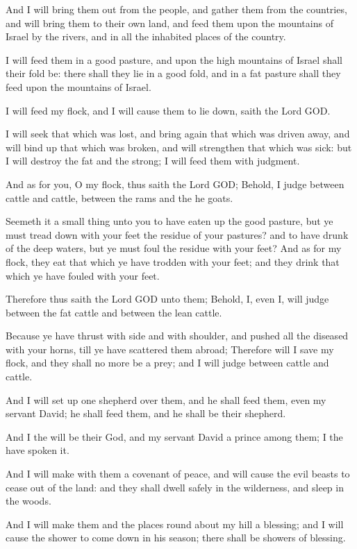 \Verse And I will bring them out from the people, and gather them from the countries, and will bring them to their own land, and feed them upon the mountains of Israel by the rivers, and in all the inhabited places of the country.

\Verse I will feed them in a good pasture, and upon the high mountains of Israel shall their fold be: there shall they lie in a good fold, and in a fat pasture shall they feed upon the mountains of Israel.

\Verse I will feed my flock, and I will cause them to lie down, saith the Lord GOD.

\Verse I will seek that which was lost, and bring again that which was driven away, and will bind up that which was broken, and will strengthen that which was sick: but I will destroy the fat and the strong; I will feed them with judgment.

\Verse And as for you, O my flock, thus saith the Lord GOD; Behold, I judge between cattle and cattle, between the rams and the he goats.

\Verse Seemeth it a small thing unto you to have eaten up the good pasture, but ye must tread down with your feet the residue of your pastures? and to have drunk of the deep waters, but ye must foul the residue with your feet?  \Verse And as for my flock, they eat that which ye have trodden with your feet; and they drink that which ye have fouled with your feet.

\Verse Therefore thus saith the Lord GOD unto them; Behold, I, even I, will judge between the fat cattle and between the lean cattle.

\Verse Because ye have thrust with side and with shoulder, and pushed all the diseased with your horns, till ye have scattered them abroad; \Verse Therefore will I save my flock, and they shall no more be a prey; and I will judge between cattle and cattle.

\Verse And I will set up one shepherd over them, and he shall feed them, even my servant David; he shall feed them, and he shall be their shepherd.

\Verse And I the \LORD will be their God, and my servant David a prince among them; I the \LORD have spoken it.

\Verse And I will make with them a covenant of peace, and will cause the evil beasts to cease out of the land: and they shall dwell safely in the wilderness, and sleep in the woods.

\Verse And I will make them and the places round about my hill a blessing; and I will cause the shower to come down in his season; there shall be showers of blessing.

